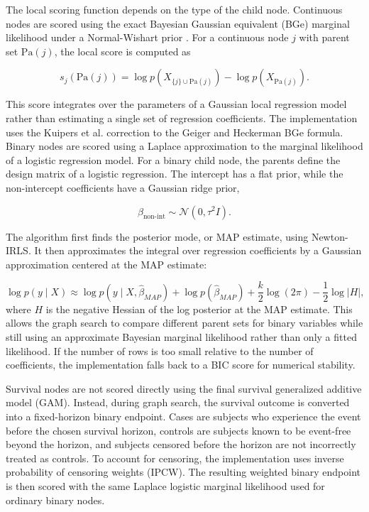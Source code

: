 \documentclass[11pt]{article}
\begin{document}
The local scoring function depends on the type of the child node. Continuous nodes are scored using the exact Bayesian Gaussian equivalent (BGe) marginal likelihood under a Normal-Wishart prior \citep{Geiger2002, Kuipers2014}. For a continuous node $j$ with parent set $\mathrm{Pa}(j)$, the local score is computed as

\[
s_j(\mathrm{Pa}(j))
=
\log p(X_{\{j\} \cup \mathrm{Pa}(j)})
-
\log p(X_{\mathrm{Pa}(j)}).
\]

This score integrates over the parameters of a Gaussian local regression model rather than estimating a single set of regression coefficients. The implementation uses the Kuipers et al. correction to the Geiger and Heckerman BGe formula. Binary nodes are scored using a Laplace approximation to the marginal likelihood of a logistic regression model. For a binary child node, the parents define the design matrix of a logistic regression. The intercept has a flat prior, while the non-intercept coefficients have a Gaussian ridge prior,

\[
\beta_{\text{non-int}} \sim \mathcal{N}(0,\tau^2 I).
\]

The algorithm first finds the posterior mode, or MAP estimate, using Newton-IRLS. It then approximates the integral over regression coefficients by a Gaussian approximation centered at the MAP estimate:

\[
\log p(y \mid X)
\approx
\log p(y \mid X,\hat{\beta}_{MAP})
+
\log p(\hat{\beta}_{MAP})
+
\frac{k}{2}\log(2\pi)
-
\frac{1}{2}\log |H|,
\]
where $H$ is the negative Hessian of the log posterior at the MAP estimate. This allows the graph search to compare different parent sets for binary variables while still using an approximate Bayesian marginal likelihood rather than only a fitted likelihood. If the number of rows is too small relative to the number of coefficients, the implementation falls back to a BIC score for numerical stability.

Survival nodes are not scored directly using the final survival generalized additive model (GAM). Instead, during graph search, the survival outcome is converted into a fixed-horizon binary endpoint. Cases are subjects who experience the event before the chosen survival horizon, controls are subjects known to be event-free beyond the horizon, and subjects censored before the horizon are not incorrectly treated as controls. To account for censoring, the implementation uses inverse probability of censoring weights (IPCW). The resulting weighted binary endpoint is then scored with the same Laplace logistic marginal likelihood used for ordinary binary nodes.
\end{document}
